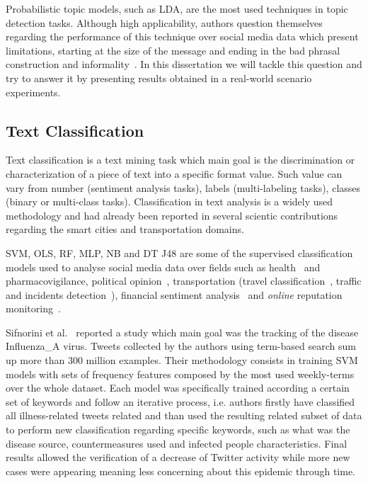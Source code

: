 Probabilistic topic models, such as \gls{LDA}, are the most used techniques in topic detection tasks. Although high applicability, authors question themselves regarding the performance of this technique over social media data which present limitations, starting at the size of the message and ending in the bad phrasal construction and informality~\cite{kn:Mehrotra2013}. In this dissertation we will tackle this question and try to answer it by presenting results obtained in a real-world scenario experiments.

\subsection{Text Classification}

Text classification is a text mining task which main goal is the discrimination or characterization of a piece of text into a specific format value. Such value can vary from number (sentiment analysis tasks), labels (multi-labeling tasks), classes (binary or multi-class tasks). Classification in text analysis is a widely used methodology and had already been reported in several scientic contributions regarding the smart cities and transportation domains.

\gls{SVM}, \gls{OLS}, \gls{RF}, \gls{MLP}, \gls{NB} and \gls{DT J48} are some of the supervised classification models used to analyse social media data over fields such as health~\cite{signorini2011use} and pharmacovigilance, political opinion~\cite{saleiro2016sentiment}, transportation (travel classification~\cite{carvalho2010real, kuflik2017automating}, traffic and incidents detection~\cite{zhang2016mining}), financial sentiment analysis~\cite{saleiro2017feup} and \textit{online} reputation monitoring~\cite{saleiro2017texrep}.

Sifnorini et al.~\cite{signorini2011use} reported a study which main goal was the tracking of the disease \gls{Influenza_A} virus. Tweets collected by the authors using term-based search sum up more than 300 million examples. Their methodology consists in training \gls{SVM} models with sets of frequency features composed by the most used weekly-terms over the whole dataset. Each model was specifically trained according a certain set of keywords and follow an iterative process, i.e. authors firstly have classified all illness-related tweets related and than used the resulting related subset of data to perform new classification regarding specific keywords, such as what was the disease source, countermeasures used and infected people characteristics. Final results allowed the verification of a decrease of Twitter activity while more new cases were appearing meaning less concerning about this epidemic through time.

